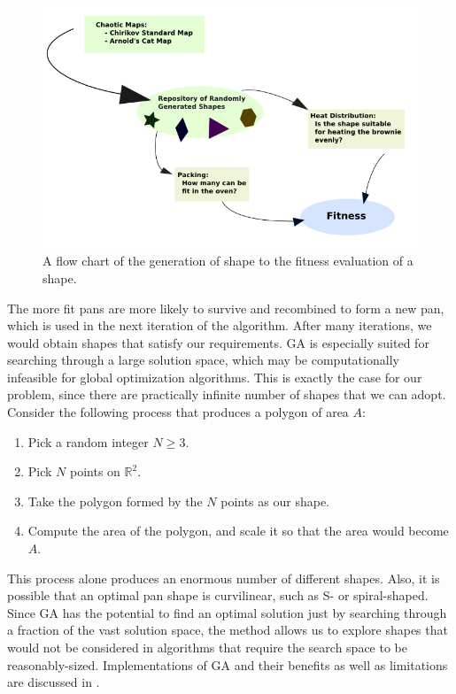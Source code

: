 \documentclass[12pt]{reedmcm}
\begin{document}
%
\begin{figure}[p]
  \centering
  \includegraphics[width=1.0\textwidth]{fitness_flowchart}
  \caption{A flow chart of the generation of shape to the fitness evaluation of a shape.}
  \label{fig:fitnessflow}
\end{figure}
%
The more fit pans are more likely to survive and recombined to form a new pan, which is used in the next iteration of the algorithm. 
After many iterations, we would obtain shapes that satisfy our requirements.
GA is especially suited for searching through a large solution space, which may be computationally infeasible for global optimization algorithms.
This is exactly the case for our problem, since there are practically infinite number of shapes that we can adopt.
Consider the following process that produces a polygon of area $A$:
\begin{enumerate}
  \item Pick a random integer $N \geq 3$.
  \item Pick $N$ points on $\mathbb{R}^2$.
  \item Take the polygon formed by the $N$ points as our shape.
  \item Compute the area of the polygon, and scale it so that the area would become $A$.
\end{enumerate}
This process alone produces an enormous number of different shapes.
Also, it is possible that an optimal pan shape is curvilinear, such as S- or spiral-shaped.
Since GA has the potential to find an optimal solution just by searching through a fraction of the vast solution space, the method allows us to explore shapes that would not be considered in algorithms that require the search space to be reasonably-sized.
Implementations of GA and their benefits as well as limitations are discussed in \citet{mitchell}.
\end{document}
